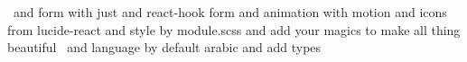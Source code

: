  and form with just and react-hook form and animation with motion and icons from lucide-react and style by module.scss and add your magics to make all thing beautiful  and language by default arabic and add types  